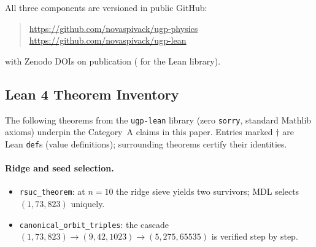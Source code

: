 \documentclass[11pt]{article}
\theoremstyle{remark}
\begin{document}
\noindent
All three components are versioned in public GitHub:
\begin{quote}
\small\raggedright\sloppy
\url{https://github.com/novaspivack/ugp-physics}\\
\url{https://github.com/novaspivack/ugp-lean}
\end{quote}
\noindent
with Zenodo DOIs on publication (\cite{SpivackUGPFormalization} for the Lean library).

\newpage

\begin{appendices}

\section{Lean 4 Theorem Inventory}
\label{app:lean_inventory}

The following theorems from the \texttt{ugp-lean} library (zero \texttt{sorry}, standard Mathlib axioms) underpin the Category~A claims in this paper.  Entries marked $\dagger$ are Lean \texttt{def}s (value definitions); surrounding theorems certify their identities.

\paragraph{Ridge and seed selection.}
\begin{itemize}[leftmargin=1.2em,itemsep=0.1em,topsep=0.2em]
  \item \texttt{rsuc\_theorem}: at $n{=}10$ the ridge sieve yields two survivors; MDL selects $(1,73,823)$ uniquely.
  \item \texttt{canonical\_orbit\_triples}: the cascade $(1,73,823) \to (9,42,1023) \to (5,275,65535)$ is verified step by step.
\end{itemize}


\end{appendices}
\end{document}
